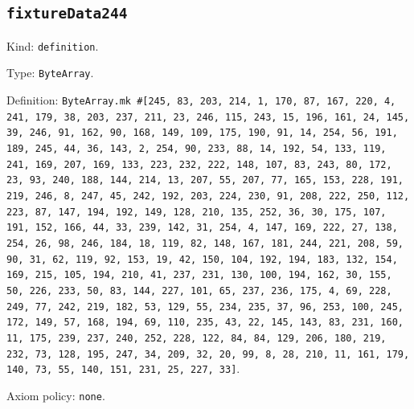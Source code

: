 \documentclass[11pt]{article}
\begin{document}
\subsection*{\texttt{fixtureData244}}
\noindent Kind: \texttt{definition}.\par
\noindent Type: \texttt{ByteArray}.\par
\noindent Definition: \texttt{ByteArray.mk \#[245, 83, 203, 214, 1, 170, 87, 167, 220, 4, 241, 179, 38, 203, 237, 211, 23, 246, 115, 243, 15, 196, 161, 24, 145, 39, 246, 91, 162, 90, 168, 149, 109, 175, 190, 91, 14, 254, 56, 191, 189, 245, 44, 36, 143, 2, 254, 90, 233, 88, 14, 192, 54, 133, 119, 241, 169, 207, 169, 133, 223, 232, 222, 148, 107, 83, 243, 80, 172, 23, 93, 240, 188, 144, 214, 13, 207, 55, 207, 77, 165, 153, 228, 191, 219, 246, 8, 247, 45, 242, 192, 203, 224, 230, 91, 208, 222, 250, 112, 223, 87, 147, 194, 192, 149, 128, 210, 135, 252, 36, 30, 175, 107, 191, 152, 166, 44, 33, 239, 142, 31, 254, 4, 147, 169, 222, 27, 138, 254, 26, 98, 246, 184, 18, 119, 82, 148, 167, 181, 244, 221, 208, 59, 90, 31, 62, 119, 92, 153, 19, 42, 150, 104, 192, 194, 183, 132, 154, 169, 215, 105, 194, 210, 41, 237, 231, 130, 100, 194, 162, 30, 155, 50, 226, 233, 50, 83, 144, 227, 101, 65, 237, 236, 175, 4, 69, 228, 249, 77, 242, 219, 182, 53, 129, 55, 234, 235, 37, 96, 253, 100, 245, 172, 149, 57, 168, 194, 69, 110, 235, 43, 22, 145, 143, 83, 231, 160, 11, 175, 239, 237, 240, 252, 228, 122, 84, 84, 129, 206, 180, 219, 232, 73, 128, 195, 247, 34, 209, 32, 20, 99, 8, 28, 210, 11, 161, 179, 140, 73, 55, 140, 151, 231, 25, 227, 33]}.\par
\noindent Axiom policy: \texttt{none}.\par
\end{document}
